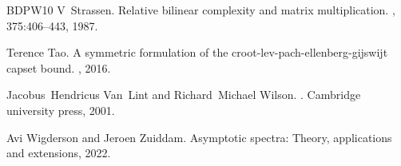 \documentclass[10pt,a4paper]{article}
\begin{document}
\begin{thebibliography}{BDPW10}
V~Strassen.
\newblock Relative bilinear complexity and matrix multiplication.
,
  375:406--443, 1987.

Terence Tao.
\newblock A symmetric formulation of the croot-lev-pach-ellenberg-gijswijt
  capset bound.
, 2016.

Jacobus~Hendricus Van~Lint and Richard~Michael Wilson.
.
\newblock Cambridge university press, 2001.

Avi Wigderson and Jeroen Zuiddam.
\newblock Asymptotic spectra: Theory, applications and extensions, 2022.

\end{thebibliography}
\end{document}
